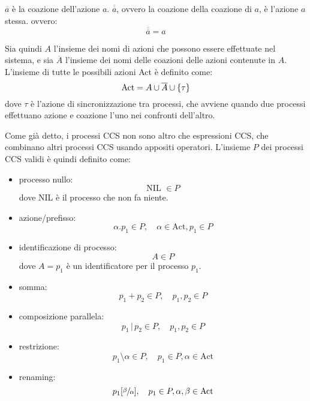 \begin{rem}
    $\overline{a}$ è la coazione dell'azione $a$. $\overline{\overline{a}}$,
    ovvero la coazione della coazione di $a$, è l'azione $a$ stessa. ovvero:
    \[
        \overline{\overline{a}} = a
    \]
\end{rem}

Sia quindi $A$ l'insieme dei nomi di azioni che possono essere effettuate nel sistema,
e sia $\overline{A}$ l'insieme dei nomi delle coazioni delle azioni contenute in $A$.
L'insieme di tutte le possibili azioni Act è definito come:
\[
    \text{Act} = A \cup \overline{A} \cup \left\{\tau\right\}
\]
dove $\tau$ è l'azione di sincronizzazione tra processi, che avviene
quando due processi effettuano azione e coazione l'uno nei confronti dell'altro.

Come già detto, i processi CCS non sono altro che espressioni CCS,
che combinano altri processi CCS usando appositi operatori.
L'insieme $P$ dei processi CCS validi è quindi definito come:
\begin{itemize}
    \item processo nullo:
    \[
        \text{NIL } \in P
    \]
    dove NIL è il processo che non fa niente.
    \item azione/prefisso:
    \[
        \alpha.p_1 \in P, \quad \alpha \in \text{Act}, p_1 \in P
    \]
    \item identificazione di processo:
    \[
        A \in P
    \]
    dove $A = p_1$ è un identificatore per il processo $p_1$.
    \item somma:
    \[
        p_1 + p_2 \in P, \quad p_1, p_2 \in P
    \]
    \item composizione parallela:
    \[
        p_1 \,|\, p_2 \in P, \quad p_1, p_2 \in P
    \]
    \item restrizione:
    \[
        p_1 \setminus \alpha \in P, \quad p_1 \in P, \alpha \in \text{Act}
    \]
    \item renaming:
    \[
        p_1[\sfrac{\beta}{\alpha}], \quad p_1 \in P, \alpha, \beta \in \text{Act}
    \]
\end{itemize}


